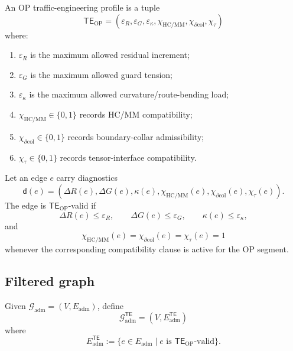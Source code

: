 \begin{definition}
\label{def:v410r16-op-traffic-engineering-profile}
An OP traffic-engineering profile is a tuple
\[
 \mathsf{TE}_{\mathrm{OP}}
 =
 (\varepsilon_R,\varepsilon_G,\varepsilon_\kappa,
 \chi_{\mathrm{HC/MM}},\chi_{\partial\mathrm{col}},\chi_{\tau})
\]
where:
\begin{enumerate}[leftmargin=*]
 \item \(\varepsilon_R\) is the maximum allowed residual increment;
 \item \(\varepsilon_G\) is the maximum allowed guard tension;
 \item \(\varepsilon_\kappa\) is the maximum allowed curvature/route-bending
 load;
 \item \(\chi_{\mathrm{HC/MM}}\in\{0,1\}\) records HC/MM compatibility;
 \item \(\chi_{\partial\mathrm{col}}\in\{0,1\}\) records boundary-collar
 admissibility;
 \item \(\chi_{\tau}\in\{0,1\}\) records tensor-interface compatibility.
\end{enumerate}
\end{definition}

\begin{definition}
\label{def:v410r16-te-valid-edge}
Let an edge \(e\) carry diagnostics
\[
 \mathsf d(e)
 =
 (\Delta R(e),\Delta G(e),\kappa(e),
 \chi_{\mathrm{HC/MM}}(e),
 \chi_{\partial\mathrm{col}}(e),
 \chi_{\tau}(e)).
\]
The edge is \(\mathsf{TE}_{\mathrm{OP}}\)-valid if
\[
 \Delta R(e)\leq\varepsilon_R,\qquad
 \Delta G(e)\leq\varepsilon_G,\qquad
 \kappa(e)\leq\varepsilon_\kappa,
\]
and
\[
 \chi_{\mathrm{HC/MM}}(e)=
 \chi_{\partial\mathrm{col}}(e)=
 \chi_{\tau}(e)=1
\]
whenever the corresponding compatibility clause is active for the OP segment.
\end{definition}

\subsection{Filtered graph}
\label{subsec:v410r16-filtered-graph}

\begin{definition}
\label{def:v410r16-te-filtered-admissible-graph}
Given \(\mathcal G_{\mathrm{adm}}=(V,E_{\mathrm{adm}})\), define
\[
 \mathcal G_{\mathrm{adm}}^{\mathsf{TE}}
 =
 (V,E_{\mathrm{adm}}^{\mathsf{TE}})
\]
where
\[
 E_{\mathrm{adm}}^{\mathsf{TE}}
 :=
 \{e\in E_{\mathrm{adm}}\mid e
 \text{ is }\mathsf{TE}_{\mathrm{OP}}\text{-valid}\}.
\]
\end{definition}


